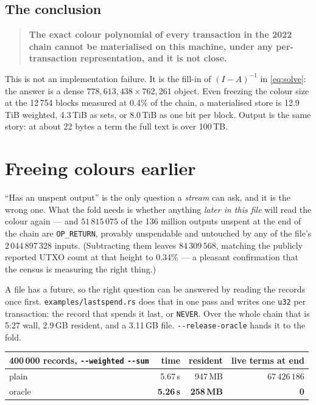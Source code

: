 \documentclass[11pt,a4paper]{article}
\newcommand{\bin}[1]{\texttt{#1}}
\newcommand{\flag}[1]{\texttt{-{}-#1}}
\begin{document}
\subsection{The conclusion}

\begin{quote}
  \textbf{The exact colour polynomial of every transaction in the 2022 chain
  cannot be materialised on this machine, under any per-transaction
  representation, and it is not close.}
\end{quote}

This is not an implementation failure. It is the fill-in of $(I-A)^{-1}$ in
\eqref{eq:solve}: the answer is a dense $778{,}613{,}438 \times 762{,}261$
object. Even freezing the colour size at the 12\,754 blocks measured at 0.4\% of
the chain, a materialised store is 12.9\,TiB weighted, 4.3\,TiB as sets, or
8.0\,TiB as one bit per block. Output is the same story: at about 22 bytes a
term the full text is over 100\,TB.

\section{Freeing colours earlier}
\label{sec:oracle}

``Has an unspent output'' is the only question a \emph{stream} can ask, and it is
the wrong one. What the fold needs is whether anything \emph{later in this file}
will read the colour again --- and $51\,815\,075$ of the 136 million outputs
unspent at the end of the chain are \texttt{OP\_RETURN}, provably unspendable and
untouched by any of the file's $2\,044\,897\,328$ inputs. (Subtracting them
leaves $84\,309\,568$, matching the publicly reported UTXO count at that height
to 0.34\% --- a pleasant confirmation that the census is measuring the right
thing.)

A file has a future, so the right question can be answered by reading the records
once first. \bin{examples/lastspend.rs} does that in one pass and writes one
\texttt{u32} per transaction: the record that spends it last, or \texttt{NEVER}.
Over the whole chain that is 5:27 wall, 2.9\,GB resident, and a 3.11\,GB file.
\flag{release-oracle} hands it to the fold.

\begin{center}
\begin{tabular}{lrrr}
\toprule
400\,000 records, \flag{weighted} \flag{sum} & time & resident & live terms at end \\
\midrule
plain  & 5.67\,s & 947\,MB & $67\,426\,186$ \\
oracle & \textbf{5.26\,s} & \textbf{258\,MB} & \textbf{0} \\
\bottomrule
\end{tabular}
\end{center}
\end{document}
